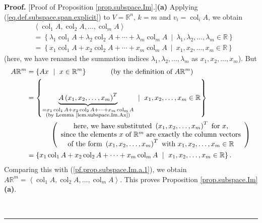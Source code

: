 \documentclass[numbers=enddot,12pt,final,onecolumn,notitlepage]{scrartcl}%
\theoremstyle{definition}
\newenvironment{proof}[1][Proof]{\noindent\textbf{#1.} }{\ \rule{0.5em}{0.5em}}
\begin{document}
\begin{proof}
[Proof of Proposition \ref{prop.subspace.Im}.]\textbf{(a)} Applying
(\ref{eq.def.subspace.span.explicit}) to $V=\mathbb{R}^{n}$, $k=m$ and
$v_{i}=\operatorname*{col}\nolimits_{i}A$, we obtain%
\begin{align}
&  \left\langle \operatorname*{col}\nolimits_{1}A,\operatorname*{col}%
\nolimits_{2}A,\ldots,\operatorname*{col}\nolimits_{m}A\right\rangle
\nonumber\\
&  =\left\{  \lambda_{1}\operatorname*{col}\nolimits_{1}A+\lambda
_{2}\operatorname*{col}\nolimits_{2}A+\cdots+\lambda_{m}\operatorname*{col}%
\nolimits_{m}A\ \mid\ \lambda_{1},\lambda_{2},\ldots,\lambda_{m}\in
\mathbb{R}\right\} \nonumber\\
&  =\left\{  x_{1}\operatorname*{col}\nolimits_{1}A+x_{2}\operatorname*{col}%
\nolimits_{2}A+\cdots+x_{m}\operatorname*{col}\nolimits_{m}A\ \mid
\ x_{1},x_{2},\ldots,x_{m}\in\mathbb{R}\right\}
\label{pf.prop.subspace.Im.a.1}%
\end{align}
(here, we have renamed the summation indices $\lambda_{1},\lambda_{2}%
,\ldots,\lambda_{m}$ as $x_{1},x_{2},\ldots,x_{m}$). But%
\begin{align*}
A\mathbb{R}^{m}  &  =\left\{  Ax\ \mid\ x\in\mathbb{R}^{m}\right\}
\ \ \ \ \ \ \ \ \ \ \left(  \text{by the definition of }A\mathbb{R}^{m}\right)
\\
&  =\left\{  \underbrace{A\left(  x_{1},x_{2},\ldots,x_{m}\right)  ^{T}%
}_{\substack{=x_{1}\operatorname*{col}\nolimits_{1}A+x_{2}\operatorname*{col}%
\nolimits_{2}A+\cdots+x_{m}\operatorname*{col}\nolimits_{m}A\\\text{(by Lemma
\ref{lem.subspace.Im.Ax})}}}\ \mid\ x_{1},x_{2},\ldots,x_{m}\in\mathbb{R}%
\right\} \\
&  \ \ \ \ \ \ \ \ \ \ \left(
\begin{array}
[c]{c}%
\text{here, we have substituted }\left(  x_{1},x_{2},\ldots,x_{m}\right)
^{T}\text{ for }x\text{,}\\
\text{since the elements }x\text{ of }\mathbb{R}^{m}\text{ are exactly the
column vectors}\\
\text{of the form }\left(  x_{1},x_{2},\ldots,x_{m}\right)  ^{T}\text{ with
}x_{1},x_{2},\ldots,x_{m}\in\mathbb{R}%
\end{array}
\right) \\
&  =\left\{  x_{1}\operatorname*{col}\nolimits_{1}A+x_{2}\operatorname*{col}%
\nolimits_{2}A+\cdots+x_{m}\operatorname*{col}\nolimits_{m}A\ \mid
\ x_{1},x_{2},\ldots,x_{m}\in\mathbb{R}\right\}  .
\end{align*}
Comparing this with (\ref{pf.prop.subspace.Im.a.1}), we obtain $A\mathbb{R}%
^{m}=\left\langle \operatorname*{col}\nolimits_{1}A,\operatorname*{col}%
\nolimits_{2}A,\ldots,\operatorname*{col}\nolimits_{m}A\right\rangle $. This
proves Proposition \ref{prop.subspace.Im} \textbf{(a)}.


\end{proof}
\end{document}
